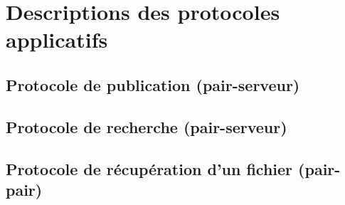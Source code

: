 \section{Descriptions des protocoles applicatifs}
\subsection{Protocole de publication (pair-serveur)}

\subsection{Protocole de recherche (pair-serveur)}

\subsection{Protocole de récupération d'un fichier (pair-pair)}